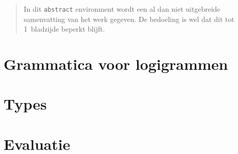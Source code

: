 \documentclass[master=cws,masteroption=ai,inputenc=utf8,dutch]{kulemt}
\theoremstyle{definition}
\begin{document}

\tableofcontents*

\begin{abstract}
  In dit \texttt{abstract} environment wordt een al dan niet uitgebreide
  samenvatting van het werk gegeven. De bedoeling is wel dat dit tot
  1~bladzijde beperkt blijft.

  \lipsum[1]
\end{abstract}

\listoffiguresandtables





\mainmatter



% 



\chapter{Grammatica voor logigrammen}
\chapter{Types}
\label{ch:types}

\chapter{Evaluatie}

% 
% 
% 
% 

\appendixpage*          %
% 
% 

\backmatter


\end{document}
